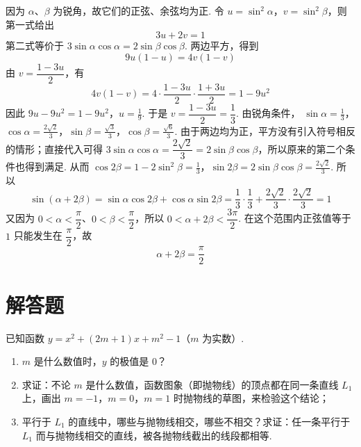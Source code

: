 \begin{solution}
因为 \(\alpha\)、\(\beta\) 为锐角，故它们的正弦、余弦均为正. 令 \(u=\sin^{2}\alpha\)，\(v=\sin^{2}\beta\)，则第一式给出
\[
3u+2v=1
\]
第二式等价于 \(3\sin\alpha\cos\alpha=2\sin\beta\cos\beta\). 两边平方，得到
\[
9u(1-u)=4v(1-v)
\]
由 \(v=\dfrac{1-3u}{2}\)，有
\[
4v(1-v)=4\cdot\frac{1-3u}{2}\cdot\frac{1+3u}{2}=1-9u^{2}
\]
因此
\(9u-9u^{2}=1-9u^{2}\)，\(u=\frac{1}{9}\).
于是 \(v=\dfrac{1-3u}{2}=\dfrac{1}{3}\). 由锐角条件，
\(\sin\alpha=\frac{1}{3}\)，\(\cos\alpha=\frac{2\sqrt{2}}{3}\)，\(\sin\beta=\frac{\sqrt{3}}{3}\)，\(\cos\beta=\frac{\sqrt{6}}{3}\).
由于两边均为正，平方没有引入符号相反的情形；直接代入可得
\(3\sin\alpha\cos\alpha=\dfrac{2\sqrt{2}}{3}=2\sin\beta\cos\beta\)，所以原来的第二个条件也得到满足.
从而
\(\cos2\beta=1-2\sin^{2}\beta=\frac{1}{3}\)，\(\sin2\beta=2\sin\beta\cos\beta=\frac{2\sqrt{2}}{3}\).
所以
\[
\sin(\alpha+2\beta)=\sin\alpha\cos2\beta+\cos\alpha\sin2\beta
=\frac{1}{3}\cdot\frac{1}{3}+\frac{2\sqrt{2}}{3}\cdot\frac{2\sqrt{2}}{3}=1
\]
又因为 \(0<\alpha<\dfrac{\pi}{2}\)、\(0<\beta<\dfrac{\pi}{2}\)，所以 \(0<\alpha+2\beta<\dfrac{3\pi}{2}\). 在这个范围内正弦值等于 \(1\) 只能发生在 \(\dfrac{\pi}{2}\)，故
\[
\alpha+2\beta=\frac{\pi}{2}
\]
\end{solution}

\section{解答题}

\begin{problem}
已知函数 \(y=x^{2}+(2m+1)x+m^{2}-1\)（\(m\) 为实数）.

\begin{enumerate}
\item \(m\) 是什么数值时，\(y\) 的极值是 \(0\)？
\item 求证：不论 \(m\) 是什么数值，函数图象（即抛物线）的顶点都在同一条直线 \(L_{1}\) 上，画出 \(m=-1\)，\(m=0\)，\(m=1\) 时抛物线的草图，来检验这个结论；
\item 平行于 \(L_{1}\) 的直线中，哪些与抛物线相交，哪些不相交？求证：任一条平行于 \(L_{1}\) 而与抛物线相交的直线，被各抛物线截出的线段都相等.
\end{enumerate}
\end{problem}

